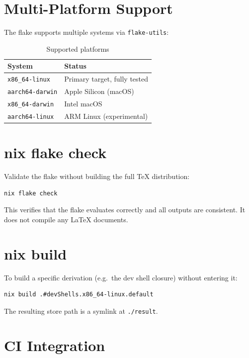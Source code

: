 \section{Multi-Platform Support}

The flake supports multiple systems via \texttt{flake-utils}:

\begin{table}[htbp]
  \centering
  \caption{Supported platforms}
  \label{tab:nix-platforms}
  \begin{tabular}{@{}ll@{}}
    \toprule
    \textbf{System} & \textbf{Status} \\
    \midrule
    \texttt{x86\_64-linux}   & Primary target, fully tested \\
    \texttt{aarch64-darwin}  & Apple Silicon (macOS) \\
    \texttt{x86\_64-darwin}  & Intel macOS \\
    \texttt{aarch64-linux}   & ARM Linux (experimental) \\
    \bottomrule
  \end{tabular}
\end{table}

\section{nix flake check}

Validate the flake without building the full TeX distribution:

\begin{verbatim}
nix flake check
\end{verbatim}

This verifies that the flake evaluates correctly and all outputs are
consistent.  It does not compile any \LaTeX{} documents.

\section{nix build}

To build a specific derivation (e.g.\ the dev shell closure) without
entering it:

\begin{verbatim}
nix build .#devShells.x86_64-linux.default
\end{verbatim}

The resulting store path is a symlink at \texttt{./result}.

\section{CI Integration}

